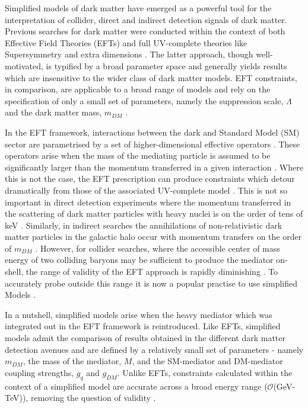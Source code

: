 \begin{flushleft}
Simplified models of dark matter have emerged as a powerful tool for the interpretation of collider, direct and indirect detection signals of dark matter. Previous searches for dark matter were conducted within the context of both Effective Field Theories (EFTs) \cite{Aad:1363019, ATLAS-CONF-2012-147, CMS-PAS-EXO-12-048, Buckley:2013jwa, Abdallah:1472683, MonoZ, MonoX} and full UV-complete theories like Supersymmetry \cite{ComppMSSM, Aad:2012ms, Aad:2012fqa, Aad:2014wea, SUSY_official_paper} and extra dimensions \cite{}. The latter approach, though well-motivated, is typified by a broad parameter space and generally yields results which are insensitive to the wider class of dark matter models. EFT constraints, in comparison, are applicable to a broad range of models and rely on the specification of only a small set of parameters, namely the suppression scale, $\Lambda$ and the dark matter mass, $m_{DM}$ \cite{}.

\hspace{1cm}In the EFT framework, interactions between the dark and Standard Model (SM) sector are parametrised by a set of higher-dimensional effective operators \cite{}. These operators arise when the mass of the mediating particle is assumed to be significantly larger than the momentum transferred in a given interaction \cite{}. Where this is not the case, the EFT prescription can produce constraints which detour dramatically from those of the associated UV-complete model \cite{Bai:2010hh, DMCons2, Fox:2011fx, Graesser:2011vj, An:2011ck}. This is not so important in direct detection experiments where the momentum transferred in the scattering of dark matter particles with heavy nuclei is on the order of tens of keV \cite{EFTDM, DMCons3}. Similarly, in indirect searches the annihilations of non-relativistic dark matter particles in the galactic halo occur with momentum transfers on the order of $m_{DM}$ \cite{}. However, for collider searches, where the accessible center of mass energy of two colliding baryons may be sufficient to produce the mediator on-shell, the range of validity of the EFT approach is rapidly diminishing \cite{}. 
To accurately probe outside this range it is now a popular practise to use simplified Models \cite{Buchmueller:2014yoa}.

\hspace{1cm}In a nutshell, simplified models arise when the heavy mediator which was integrated out in the EFT framework is reintroduced. Like EFTs, simplified models admit the comparison of results obtained in the different dark matter detection avenues \cite{} and are defined by a relatively small set of parameters - namely $m_{DM}$, the mass of the mediator, $M$, and the SM-mediator and DM-mediator coupling strengths, $g_{q}$ and $g_{DM}$. Unlike EFTs, constraints calculated within the context of a simplified model are accurate across a broad energy range ($\mathcal{O}$(GeV-TeV)), removing the question of validity \cite{}. 


\end{flushleft}
